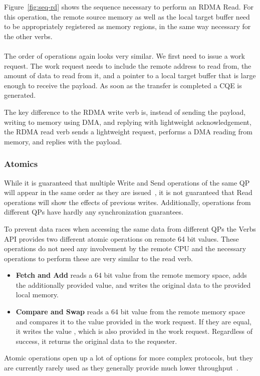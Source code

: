 Figure~\ref{fig:seq-rd} shows the sequence necessary to perform an RDMA Read. For this operation, the remote source memory as
well as the local target buffer need to be appropriately registered as memory regions, in the same way necessary for the
other verbs.

\paragraph{} The order of operations again looks very similar. We first need to issue a work request. The work request needs 
to include the remote address to read from, the amount of data to read from it, and a pointer to a local target buffer that is large
enough to receive the payload. As soon as the  transfer is completed a CQE is generated. 

The key difference to the RDMA write verb is, 
instead of sending the payload, writing to memory using DMA, and replying with lightweight acknowledgement, the 
RDMA read verb sends a lightweight request, performs a DMA reading from memory, and replies with the payload.

\pagebreak
\subsubsection{Atomics}

While it is guaranteed that multiple Write and Send operations of the same QP will appear in the same order as they are 
issued~\cite{rdma-reference}, it is not guaranteed that Read operations will show the effects of previous writes. 
Additionally, operations from
different QPs have hardly any synchronization guarantees.

To prevent data races when accessing the same data from different QPs the Verbs API provides two different atomic operations 
on remote 64 bit values. These operations do not need any involvement by the remote CPU and the necessary operations 
to perform these are very similar to the read verb.


\begin{itemize}
  \item \textbf{Fetch and Add} reads a 64 bit value from the remote memory space, adds the additionally provided 
     value, and writes the original data to the provided local memory.
  \item \textbf{Compare and Swap} reads a 64 bit value from the remote memory space and compares it to 
    the  value provided in the work request. If they are equal, it writes the value ,
    which is also provided in the work request. Regardless of success, it returns the original data to the requester.
\end{itemize}

Atomic operations open up a lot of options for more complex protocols, but they are currently rarely used as they generally
provide much lower throughput~\cite{anuj-guide}.


